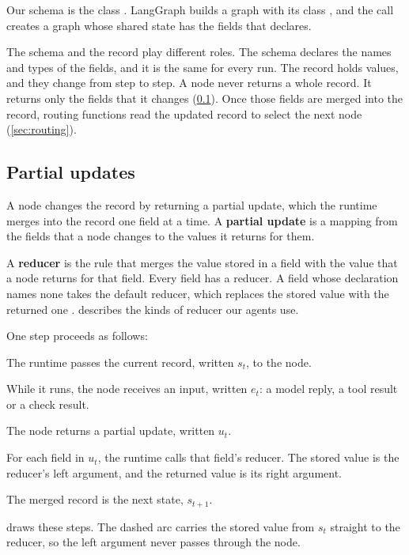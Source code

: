Our schema is the class . LangGraph builds a graph with its class
, and the call  creates a graph whose shared
state has the fields that  declares.

The schema and the record play different roles. The schema declares the names and types of the
fields, and it is the same for every run. The record holds values, and they change from step to
step. A node never returns a whole record. It returns only the fields that it changes
(\cref{sec:records-updates}). Once those fields are merged into the record, routing functions read
the updated record to select the next node (\cref{sec:routing}).

\subsection{Partial updates}
\label{sec:records-updates}

A node changes the record by returning a partial update, which the runtime merges into the record
one field at a time. A \textbf{partial update} is a mapping from the fields that a node changes to
the values it returns for them.

A \textbf{reducer} is the rule that merges the value stored in a field with the value that a node
returns for that field. Every field has a reducer. A field whose declaration names none takes the
default reducer, which replaces the stored value with the returned one \citep{langgraph-graph-api}.
 describes the kinds of reducer our agents use.

One step proceeds as follows:
\be
\item The runtime passes the current record, written $s_t$, to the node.
\item While it runs, the node receives an input, written $e_t$: a model reply, a tool result or a
check result.
\item The node returns a partial update, written $u_t$.
\item For each field in $u_t$, the runtime calls that field's reducer. The stored value is the
reducer's left argument, and the returned value is its right argument.
\item The merged record is the next state, $s_{t+1}$.
\ee

 draws these steps. The dashed arc carries the stored value from $s_t$
straight to the reducer, so the left argument never passes through the node.

